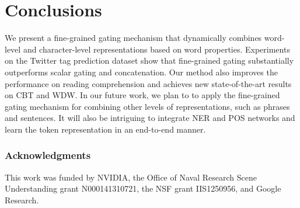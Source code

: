 \documentclass{article} \usepackage{iclr2017_conference,times}
\begin{document}
 
\section{Conclusions}

We present a fine-grained gating mechanism that dynamically combines word-level and character-level representations based on word properties. Experiments on the Twitter tag prediction dataset show that fine-grained gating substantially outperforms scalar gating and concatenation. Our method also improves the performance on reading comprehension and achieves new state-of-the-art results on CBT and WDW. In our future work, we plan to to apply the fine-grained gating mechanism for combining other levels of representations, such as phrases and sentences. It will also be intriguing to integrate NER and POS networks and learn the token representation in an end-to-end manner.
 
\subsubsection*{Acknowledgments}

This work was funded by NVIDIA, the Office of Naval Research Scene Understanding grant N000141310721, the NSF grant IIS1250956, and Google Research.

\small


\end{document}
